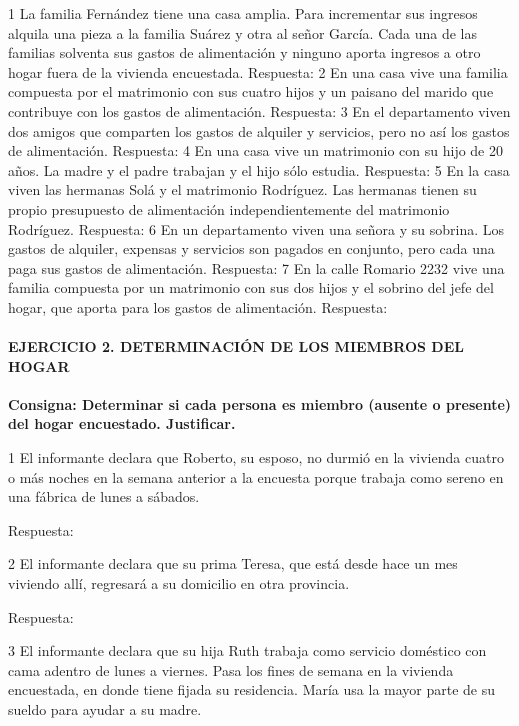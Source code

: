 \documentclass[
  openany]{book}
\begin{document}
1 La familia Fernández tiene una casa amplia. Para incrementar sus ingresos alquila una pieza a la familia Suárez y otra al señor García. Cada una de las familias solventa sus gastos de alimentación y ninguno aporta ingresos a otro hogar fuera de la vivienda encuestada. Respuesta: 2 En una casa vive una familia compuesta por el matrimonio con sus cuatro hijos y un paisano del marido que contribuye con los gastos de alimentación. Respuesta: 3 En el departamento viven dos amigos que comparten los gastos de alquiler y servicios, pero no así los gastos de alimentación. Respuesta: 4 En una casa vive un matrimonio con su hijo de 20 años. La madre y el padre trabajan y el hijo sólo estudia. Respuesta: 5 En la casa viven las hermanas Solá y el matrimonio Rodríguez. Las hermanas tienen su propio presupuesto de alimentación independientemente del matrimonio Rodríguez. Respuesta: 6 En un departamento viven una señora y su sobrina. Los gastos de alquiler, expensas y servicios son pagados en conjunto, pero cada una paga sus gastos de alimentación. Respuesta: 7 En la calle Romario 2232 vive una familia compuesta por un matrimonio con sus dos hijos y el sobrino del jefe del hogar, que aporta para los gastos de alimentación. Respuesta:

\hypertarget{ejercicio-2.-determinaciuxf3n-de-los-miembros-del-hogar}{%
\paragraph{\texorpdfstring{\textbf{EJERCICIO 2. DETERMINACIÓN DE LOS MIEMBROS DEL HOGAR}}{EJERCICIO 2. DETERMINACIÓN DE LOS MIEMBROS DEL HOGAR}}\label{ejercicio-2.-determinaciuxf3n-de-los-miembros-del-hogar}}

\textbf{Consigna: Determinar si cada persona es miembro (ausente o presente) del hogar encuestado. Justificar.}

1 El informante declara que Roberto, su esposo, no durmió en la vivienda cuatro o más noches en la semana anterior a la encuesta porque trabaja como sereno en una fábrica de lunes a sábados.

Respuesta:

2 El informante declara que su prima Teresa, que está desde hace un mes viviendo allí, regresará a su domicilio en otra provincia.

Respuesta:

3 El informante declara que su hija Ruth trabaja como servicio doméstico con cama adentro de lunes a viernes. Pasa los fines de semana en la vivienda encuestada, en donde tiene fijada su residencia. María usa la mayor parte de su sueldo para ayudar a su madre.
\end{document}
